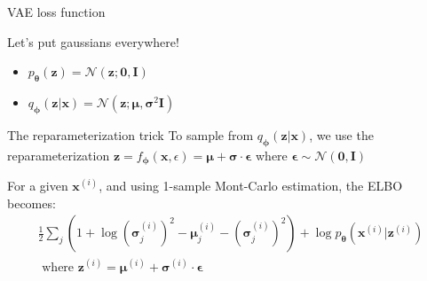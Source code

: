 \documentclass{beamer}
\begin{document}
  \begin{frame}{VAE loss function}

  
    Let's put gaussians everywhere!
    \begin{itemize}
      \item $p_{\boldsymbol{\theta}}(\mathbf{z}) = \mathcal{N}(\mathbf{z}; \mathbf{0}, \mathbf{I})$
      \item $q_{\boldsymbol{\phi}}(\mathbf{z}|\mathbf{x}) = \mathcal{N}(\mathbf{z}; \boldsymbol{\mu}, \boldsymbol{\sigma}^2\mathbf{I})$
    \end{itemize}

    \begin{block}{The reparameterization trick}
      To sample from $q_{\boldsymbol{\phi}}(\mathbf{z}|\mathbf{x})$, we use the reparameterization $\mathbf{z} = f_{\boldsymbol{\phi}}(\mathbf{x}, \epsilon) = \boldsymbol{\mu} + \boldsymbol{\sigma} \cdot \boldsymbol{\epsilon}$ where $\boldsymbol{\epsilon} \sim \mathcal{N}(\mathbf{0}, \mathbf{I})$
    \end{block}

    \small{For a given $\mathbf{x}^{(i)}$, and using 1-sample Mont-Carlo estimation, the ELBO becomes:}
    \vspace{0cm}
    \begin{multline*}
      \frac{1}{2} \sum_j \left(1 + \log (\boldsymbol{\sigma}^{(i)}_j)^2 - \boldsymbol{\mu}^{(i)}_j - (\boldsymbol{\sigma}^{(i)}_j)^2 \right) + \log p_{\boldsymbol{\theta}}(\mathbf{x}^{(i)}|\mathbf{z}^{(i)})\\
      \text{ where } \mathbf{z}^{(i)} = \boldsymbol{\mu}^{(i)} + \boldsymbol{\sigma}^{(i)} \cdot \boldsymbol{\epsilon}
    \end{multline*}

  \end{frame}
\end{document}
